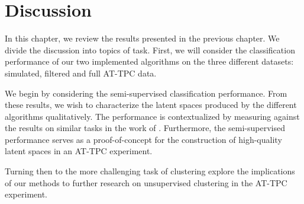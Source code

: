 \chapter{Discussion}
In this chapter, we review the results presented in the previous chapter. We divide the discussion into topics of task. First, we will consider the classification performance of our two implemented algorithms on the three different datasets: simulated, filtered and full AT-TPC data. 

We begin by considering the semi-supervised classification performance. From these results, we wish to characterize the latent spaces produced by the different algorithms qualitatively. The performance is contextualized by measuring against the results on similar tasks in the work of \citet{Kuchera2019}. Furthermore, the semi-supervised performance serves as a proof-of-concept for the construction of high-quality latent spaces in an AT-TPC experiment.

Turning then to the more challenging task of clustering explore the implications of our methods to further research on unsupervised clustering in the AT-TPC experiment.